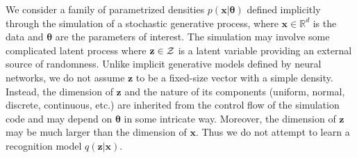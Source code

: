 \documentclass[twocolumn,superscriptaddress,aps]{revtex4-1}
\newcommand{\bftheta}{{\bm \theta}}
\newcommand{\bfx}{\mathbf{x}}
\newcommand{\bfz}{\mathbf{z}}
\theoremstyle{plain}
\begin{document}
We consider a family of parametrized densities $p(\mathbf{x}|\bftheta)$
defined implicitly through the simulation of a stochastic generative process,
where $\mathbf{x} \in \mathbb{R}^d$ is the data and $\bftheta$ are the
parameters of interest. The simulation may involve some complicated latent
process
where $\bfz \in {\cal Z}$ is a latent variable providing an external
source of randomness.
Unlike implicit generative models defined by neural networks, we do not assume
$\bfz$ to be a fixed-size vector with a simple density. Instead, the
dimension of $\bfz$ and the nature of its components (uniform, normal,
discrete, continuous, etc.) are inherited from the control flow of the
simulation code and may depend on $\bftheta$ in some intricate way. Moreover,
the dimension of $\bfz$ may be much larger than the dimension of
$\bfx$. Thus we do not attempt to learn a recognition model $q(\bfz | \bfx)$.

\end{document}
